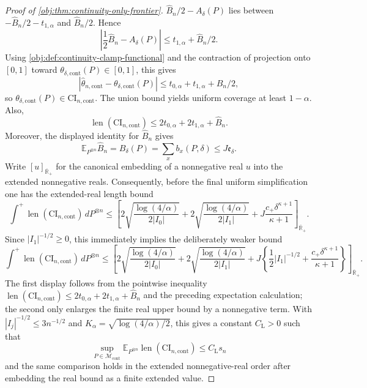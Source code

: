 \documentclass[11pt]{article}
\begin{document}
\begin{proof}[Proof of \cref{obj:thm:continuity-only-frontier}]
\(\widehat B_n/2-A_\delta(P)\) lies between
\(-\widehat B_n/2-t_{1,\alpha}\) and \(\widehat B_n/2\).  Hence
\[
\left|\frac12\widehat B_n-A_\delta(P)\right|
\leq t_{1,\alpha}+\widehat B_n/2.
\]
Using \cref{obj:def:continuity-clamp-functional} and the contraction of projection onto \([0,1]\)
toward \(\theta_{\delta,\mathrm{cont}}(P)\in[0,1]\), this gives
\[
\left|\widehat\theta_{n,\mathrm{cont}}-\theta_{\delta,\mathrm{cont}}(P)\right|
\leq t_{0,\alpha}+t_{1,\alpha}+\widehat B_n/2,
\]
so \(\theta_{\delta,\mathrm{cont}}(P)\in\mathrm{CI}_{n,\mathrm{cont}}\).  The union bound yields uniform coverage at least \(1-\alpha\).  Also,
\[
\operatorname{len}(\mathrm{CI}_{n,\mathrm{cont}})
\leq
2t_{0,\alpha}+2t_{1,\alpha}+\widehat B_n .
\]
Moreover, the displayed identity for \(\widehat B_n\) gives
\[
\mathbb E_{P^{\otimes n}}\widehat B_n
=B_\delta(P)
=\sum_x b_x(P,\delta)
\leq J\mathfrak e_\delta .
\]
Write \([u]_{\overline{\mathbb R}_+}\) for the canonical embedding of a nonnegative real \(u\) into the extended nonnegative reals.  Consequently, before the final uniform simplification one has the extended-real length bound
\[
\int^{+}\operatorname{len}(\mathrm{CI}_{n,\mathrm{cont}})\,dP^{\otimes n}
\leq
\left[
2\sqrt{\frac{\log(4/\alpha)}{2|I_0|}}
+2\sqrt{\frac{\log(4/\alpha)}{2|I_1|}}
+J\frac{c_+\delta^{\kappa+1}}{\kappa+1}
\right]_{\overline{\mathbb R}_+}.
\]
Since \(|I_1|^{-1/2}\geq0\), this immediately implies the deliberately weaker bound
\[
\int^{+}\operatorname{len}(\mathrm{CI}_{n,\mathrm{cont}})\,dP^{\otimes n}
\leq
\left[
2\sqrt{\frac{\log(4/\alpha)}{2|I_0|}}
+2\sqrt{\frac{\log(4/\alpha)}{2|I_1|}}
+J\left\{\frac12|I_1|^{-1/2}
+\frac{c_+\delta^{\kappa+1}}{\kappa+1}\right\}
\right]_{\overline{\mathbb R}_+}.
\]
The first display follows from the pointwise inequality
\(\operatorname{len}(\mathrm{CI}_{n,\mathrm{cont}})\leq2t_{0,\alpha}+2t_{1,\alpha}+\widehat B_n\) and the preceding expectation calculation; the second only enlarges the finite real upper bound by a nonnegative term.  With \(|I_j|^{-1/2}\leq3n^{-1/2}\) and
\(K_\alpha=\sqrt{\log(4/\alpha)/2}\), this gives a constant \(C_{\mathrm L}>0\) such that
\[
\sup_{P\in\mathcal M_{\mathrm{cont}}}
\mathbb E_{P^{\otimes n}}\operatorname{len}(\mathrm{CI}_{n,\mathrm{cont}})
\leq C_{\mathrm L}s_n
\]
and the same comparison holds in the extended nonnegative-real order after embedding the real bound as a finite extended value.


\end{proof}
\end{document}
